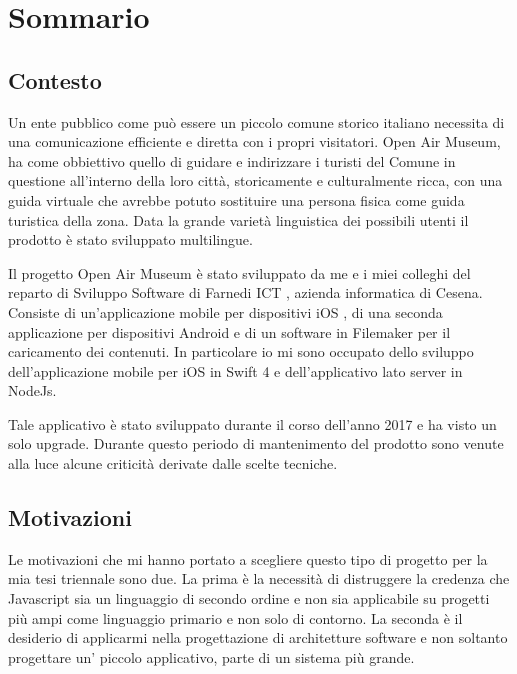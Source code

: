 \chapter*{Sommario} %
\label{sommario}

\vspace{5mm}

\section{Contesto}\vspace{5mm}

Un ente pubblico come può essere un piccolo comune storico italiano necessita di una comunicazione efficiente e diretta con i propri visitatori. Open Air Museum, ha come obbiettivo quello di guidare e indirizzare i turisti del Comune in questione all’interno della loro città, storicamente e culturalmente ricca, con una guida virtuale che avrebbe potuto sostituire una persona fisica come guida turistica della zona. Data la grande varietà linguistica dei possibili utenti il prodotto è stato sviluppato multilingue.\vspace{5mm}

Il progetto Open Air Museum è stato sviluppato da me e i miei colleghi del reparto di Sviluppo Software di Farnedi ICT\cite{FICT} , azienda informatica di Cesena. Consiste di un’applicazione mobile per dispositivi iOS\cite{IOS} , di una seconda applicazione per dispositivi Android\cite{ANDROID} e di un software in Filemaker\cite{FileMaker} per il caricamento dei contenuti. In particolare io mi sono occupato dello sviluppo dell’applicazione mobile per iOS\cite{IOS} in Swift 4\cite{Swift} e dell’applicativo lato server in NodeJs.\cite{Nodejs} \vspace{5mm}

Tale applicativo è stato sviluppato durante il corso dell'anno 2017 e ha visto un solo upgrade. Durante questo periodo di mantenimento del prodotto sono venute alla luce alcune criticità derivate dalle scelte tecniche.

\section{Motivazioni}\vspace{5mm}

Le motivazioni che mi hanno portato a scegliere questo tipo di progetto per la mia tesi triennale sono due. La prima è la necessità di distruggere la credenza che Javascript\cite{JS} sia un linguaggio di secondo ordine e non sia applicabile su progetti più ampi come linguaggio primario e non solo di contorno. La seconda è il desiderio di applicarmi nella progettazione di architetture software e non soltanto progettare un' piccolo applicativo, parte di un sistema più grande.

